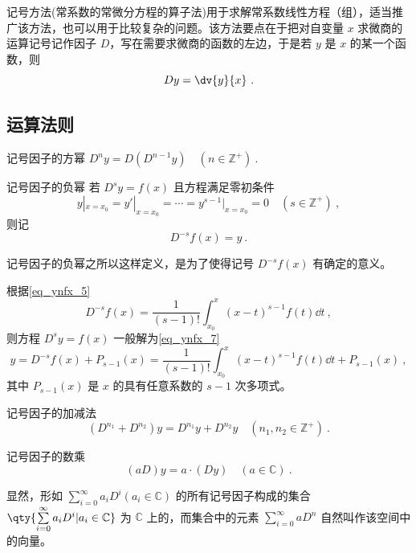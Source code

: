 

记号方法(常系数的常微分方程的算子法)用于求解常系数线性方程（组），适当推广该方法，也可以用于比较复杂的问题。该方法要点在于把对自变量 $x$ 求微商的运算记号记作因子 $D$，写在需要求微商的函数的左边，于是若 $y$ 是 $x$ 的某一个函数，则
\begin{equation}\label{eq_Sign_10}
Dy=\dv{y}{x}~.
\end{equation}
\subsection{运算法则}
\begin{definition}{记号因子的方幂}\label{def_Sign_1}
$D^ny=D(D^{n-1}y)\quad(n\in\mathbb{Z^{+}})~.$
\end{definition}
\begin{definition}{记号因子的负幂}\label{def_Sign_2}
若 $D^sy=f(x)$ 且方程满足零初条件
\begin{equation}\label{eq_Sign_5}
y|_{x=x_0}=y'|_{x=x_0}=\cdots=y^{s-1}|_{x=x_0}=0\quad({s\in\mathbb{Z^{+}}})~,
\end{equation}
则记
\begin{equation}
D^{-s}f(x)=y~.
\end{equation}
\end{definition}
记号因子的负幂之所以这样定义，是为了使得记号 $D^{-s}f(x)$ 有确定的意义。

根据\autoref{eq_ynfx_5} 
\begin{equation}\label{eq_Sign_9}
D^{-s}f(x)=\frac{1}{(s-1)!}\int_{x_0}^x(x-t)^{s-1}f(t)\dd t~,
\end{equation}
则方程 $D^sy=f(x)$ 一般解为\autoref{eq_ynfx_7} 
\begin{equation}
y=D^{-s}f(x)+P_{s-1}(x)=\frac{1}{(s-1)!}\int_{x_0}^x(x-t)^{s-1}f(t)\dd t+P_{s-1}(x)~,
\end{equation}
其中 $P_{s-1}(x)$ 是 $x$ 的具有任意系数的 $s-1$ 次多项式。
\begin{definition}{记号因子的加减法}
\begin{equation}
(D^{n_1}+D^{n_2})y=D^{n_1}y+D^{n_2}y\quad(n_1,n_2\in \mathbb{Z^{+
}})~.
\end{equation}
\end{definition}
\begin{definition}{记号因子的数乘}
\begin{equation}
(aD)y=a\cdot(Dy)\quad(a\in\mathbb{C})~.
\end{equation}
\end{definition}
显然，形如 $\sum\limits_{i=0}^\infty a_iD^i(a_i\in\mathbb{C})$ 的所有记号因子构成的集合 $\qty{\sum\limits_{i=0}^\infty a_iD^i|a_i\in\mathbb{C}}$ 为 $\mathbb C$ 上的，而集合中的元素 $\sum\limits_{i=0}^\infty aD^n$ 自然叫作该空间中的向量。

